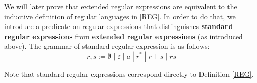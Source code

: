 
    
    We will later prove that extended regular expressions are equivalent to the inductive definition of regular languages in \ref{REG}.
    In order to do that, we introduce a predicate on regular expressions that distinguishes \textbf{standard regular expressions} 
    from \textbf{extended regular expressions} (as introduced above).
    The grammar of standard regular expression is as follows:
    \begin{equation*}
        r,s := \emptyset \; | \; \varepsilon \; | \; a \; | \; r^* \; | \; r + s \; | \; r s \; 
    \end{equation*}

    Note that standard regular expressions correspond directly to Definition \ref{REG}.



